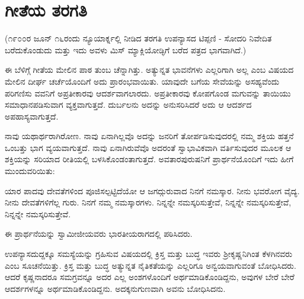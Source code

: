 
\chapter{ಗೀತೆಯ ತರಗತಿ}

(೧೯೦೦ರ ಜೂನ್ ೧೬ರಂದು ನ್ಯೂಯಾರ್ಕ್ನಲ್ಲಿ ನೀಡಿದ ತರಗತಿ ಉಪನ್ಯಾಸದ ಟಿಪ್ಪಣಿ - ಸೋದರಿ ನಿವೇದಿತ ಬರೆದುಕೊಂಡುದು ಮತ್ತು ಇದು ಅವಳು ಮಿಸ್ ಮ್ಯಾಕ್ಲಿಯೋಡ್ಳಿಗೆ ಬರೆದ ಪತ್ರದ ಭಾಗವಾಗಿದೆ.)

ಈ ಬೆಳಿಗ್ಗೆ ಗೀತೆಯ ಮೇಲಿನ ಪಾಠ ತುಂಬ ಚೆನ್ನಾಗಿತ್ತು. ಅತ್ಯುನ್ನತ ಭಾವನೆಗಳು ಎಲ್ಲರಿಗಾಗಿ ಅಲ್ಲ ಎಂಬ ವಿಷಯದ ಮೇಲಿನ ದೀರ್ಘ ಚರ್ಚೆಯೊಂದಿಗೆ ಅದು ಪ್ರಾರಂಭವಾಯಿತು. ಯಾವುದೇ ಬಗೆಯ ಸೇವೆಯನ್ನು ಅಸಹ್ಯವೆಂದು ಪರಿಗಣಿಸು ವವನಿಗೆ ಅಪ್ರತೀಕಾರವು ಆದರ್ಶವಾಗಲಾರದು. ಅಪ್ರತೀಕಾರವು ಕೋಪಗೊಂಡ ಮಗುವನ್ನು ತಾಯಿಯು ಸಮಾಧಾನಪಡಿಸುವಾಗ ವ್ಯಕ್ತವಾಗುತ್ತದೆ. ದುರ್ಬಲನು ಅದನ್ನು ಅನುಸರಿಸಿದರೆ ಅದು ಆ ಆದರ್ಶದ ಅಪಹಾಸ್ಯವಾಗುತ್ತದೆ.

ನಾವು ಯಥಾರ್ಥರಾಗಿರೋಣ. ನಾವು ಏನಾಗಿಲ್ಲವೊ ಅದನ್ನು ಜನರಿಗೆ ತೋರ್ಪಡಿಸುವುದರಲ್ಲಿ ನಮ್ಮ ಶಕ್ತಿಯ ಹತ್ತನೆ ಒಂಬತ್ತು ಭಾಗ ವ್ಯಯವಾಗುತ್ತದೆ. ನಾವು ಏನಾಗಿರುವೆವೊ ಅದರಂತೆ ಸ್ವಾಭಾವಿಕವಾಗಿ ವರ್ತಿಸುವುದರ ಮೂಲಕ ಆ ಶಕ್ತಿಯನ್ನು ಸರಿಯಾದ ರೀತಿಯಲ್ಲಿ ಬಳಸಿಕೊಂಡಂತಾಗುತ್ತದೆ. ಅವತಾರಪುರುಷನಿಗೆ ಪ್ರಾರ್ಥನೆಯೊಂದಿಗೆ ಇದು ಹೀಗೆ ಮುಂದುವರಿಯಿತು:

ಯಾರ ಪಾದವು ದೇವತೆಗಳಿಂದ ಪೂಜಿಸಲ್ಪಟ್ಟಿದೆಯೋ ಆ ಜಗದ್ಗುರುವಾದ ನಿನಗೆ ನಮಸ್ಕಾರ. ನೀನು ಭವರೋಗ ವೈದ್ಯ. ನೀನು ದೇವತೆಗಳಿಗೆಲ್ಲ ಗುರು. ನಿನಗೆ ನಮ್ಮ ನಮಸ್ಕಾರಗಳು. ನಿನ್ನನ್ನೇ ನಮಸ್ಕರಿಸುತ್ತೇವೆ, ನಿನ್ನನ್ನೇ ನಮಸ್ಕರಿಸುತ್ತೇವೆ, ನಿನ್ನನ್ನೇ ನಮಸ್ಕರಿಸುತ್ತೇವೆ.

ಈ ಪ್ರಾರ್ಥನೆಯನ್ನು ಸ್ವಾಮೀಜೀಯವರು ಭಾರತೀಯರಾಗದಲ್ಲಿ ಪಠಿಸಿದರು.

ಉಪನ್ಯಾಸದುದ್ದಕ್ಕೂ ಸಮಸ್ಯೆಯನ್ನು ಗ್ರಹಿಸುವ ವಿಷಯದಲ್ಲಿ ಕ್ರಿಸ್ತ ಮತ್ತು ಬುದ್ಧ ಇವರು ಶ‍್ರೀಕೃಷ್ಣನಿಗಿಂತ ಕೆಳಗಿನವರು ಎಂಬ ಸೂಚನೆಯಿತ್ತು. ಕ್ರಿಸ್ತ ಮತ್ತು ಬುದ್ಧ ಅತ್ಯುನ್ನತ ನೈತಿಕತೆಯನ್ನು ಎಲ್ಲರಿಗೂ ಅನ್ವಯವಾಗುವಂತೆ ಬೋಧಿಸಿದರು. ಆದರೆ ಕೃಷ್ಣನಾದರೂ ಸಮಗ್ರವನ್ನೂ ಅದರ ಎಲ್ಲ ಅಂಶಗಳೊಂದಿಗೆ ಅರ್ಥಮಾಡಿಕೊಂಡಿದ್ದನು, ಅವುಗಳ ಬೇರೆ ಬೇರೆ ಆದರ್ಶಗಳನ್ನೂ ಅರ್ಥಮಾಡಿಕೊಂಡಿದ್ದನು. ಅದಕ್ಕನುಗುಣವಾಗಿ ಅವನು ಬೋಧಿಸಿದನು.

